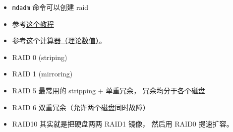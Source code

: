 
\begin{issues}
\issueDraft
\end{issues}

\begin{itemize}
\item \verb|mdadm| 命令可以创建 raid
\item 参考\href{https://www.digitalocean.com/community/tutorials/how-to-create-raid-arrays-with-mdadm-on-ubuntu-22-04}{这个教程}
\item 参考这个\href{https://www.raid-calculator.com/}{计算器（理论数值）}。
\item RAID 0 (striping)
\item RAID 1 (mirroring)
\item RAID 5 最常用的 stripping + 单重冗余， 冗余均分于各个磁盘
\item RAID 6 双重冗余（允许两个磁盘同时故障）
\item RAID10 其实就是把硬盘两两 RAID1 镜像， 然后用 RAID0 提速扩容。
\end{itemize}
